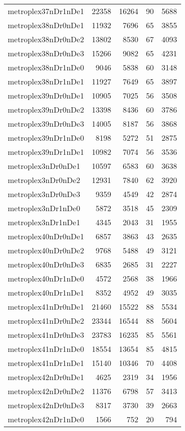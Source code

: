 \begin{longtable}{lrrrr}
metroplex37nDr1nDe1 & 22358 & 16264 & 90 & 5688 \\
metroplex38nDr0nDe1 & 11932 & 7696 & 65 & 3855 \\
metroplex38nDr0nDe2 & 13802 & 8530 & 67 & 4093 \\
metroplex38nDr0nDe3 & 15266 & 9082 & 65 & 4231 \\
metroplex38nDr1nDe0 & 9046 & 5838 & 60 & 3148 \\
metroplex38nDr1nDe1 & 11927 & 7649 & 65 & 3897 \\
metroplex39nDr0nDe1 & 10905 & 7025 & 56 & 3508 \\
metroplex39nDr0nDe2 & 13398 & 8436 & 60 & 3786 \\
metroplex39nDr0nDe3 & 14005 & 8187 & 56 & 3868 \\
metroplex39nDr1nDe0 & 8198 & 5272 & 51 & 2875 \\
metroplex39nDr1nDe1 & 10982 & 7074 & 56 & 3536 \\
metroplex3nDr0nDe1 & 10597 & 6583 & 60 & 3638 \\
metroplex3nDr0nDe2 & 12931 & 7840 & 62 & 3920 \\
metroplex3nDr0nDe3 & 9359 & 4549 & 42 & 2874 \\
metroplex3nDr1nDe0 & 5872 & 3518 & 45 & 2309 \\
metroplex3nDr1nDe1 & 4345 & 2043 & 31 & 1955 \\
metroplex40nDr0nDe1 & 6857 & 3863 & 43 & 2635 \\
metroplex40nDr0nDe2 & 9768 & 5488 & 49 & 3121 \\
metroplex40nDr0nDe3 & 6835 & 2685 & 31 & 2227 \\
metroplex40nDr1nDe0 & 4572 & 2568 & 38 & 1966 \\
metroplex40nDr1nDe1 & 8352 & 4952 & 49 & 3035 \\
metroplex41nDr0nDe1 & 21460 & 15522 & 88 & 5534 \\
metroplex41nDr0nDe2 & 23344 & 16544 & 88 & 5604 \\
metroplex41nDr0nDe3 & 23783 & 16235 & 85 & 5561 \\
metroplex41nDr1nDe0 & 18554 & 13654 & 85 & 4815 \\
metroplex41nDr1nDe1 & 15140 & 10346 & 70 & 4408 \\
metroplex42nDr0nDe1 & 4625 & 2319 & 34 & 1956 \\
metroplex42nDr0nDe2 & 11376 & 6798 & 57 & 3413 \\
metroplex42nDr0nDe3 & 8317 & 3730 & 39 & 2663 \\
metroplex42nDr1nDe0 & 1566 & 752 & 20 & 794 \\

\end{longtable}
